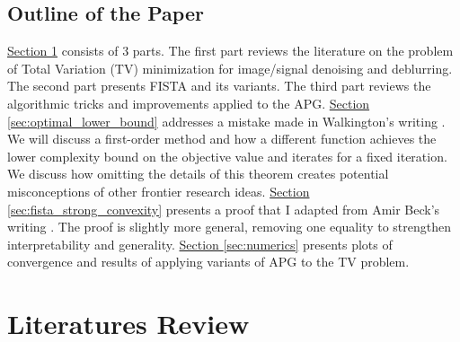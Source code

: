 \documentclass[]{article}
\theoremstyle{definition}
\numberwithin{equation}{subsection}
\begin{document}
    \subsection{Outline of the Paper}
        \hyperref[sec:Literatures]{Section \ref*{sec:Literatures}} consists of 3 parts. 
        The first part reviews the literature on the problem of Total Variation (TV) minimization for image/signal denoising and deblurring. 
        The second part presents FISTA and its variants. 
        The third part reviews the algorithmic tricks and improvements applied to the APG. 
        \hyperref[sec:optimal_lower_bound]{Section \ref*{sec:optimal_lower_bound}} addresses a mistake made in Walkington's writing \cite[theorem 2.4]{noel_nesterovs_nodate}. 
        We will discuss a first-order method and how a different function achieves the lower complexity bound on the objective value and iterates for a fixed iteration. 
        We discuss how omitting the details of this theorem creates potential misconceptions of other frontier research ideas. 
        \hyperref[sec:fista_strong_convexity]{Section \ref*{sec:fista_strong_convexity}} presents a proof that I adapted from Amir Beck's writing \cite[theorem 10.7.7]{beck_first-order_nodate}. 
        The proof is slightly more general, removing one equality to strengthen interpretability and generality. 
        \hyperref[sec:numerics]{Section \ref*{sec:numerics}} presents plots of convergence and results of applying variants of APG to the TV problem. 
        

\section{Literatures Review}\label{sec:Literatures}
\end{document}
